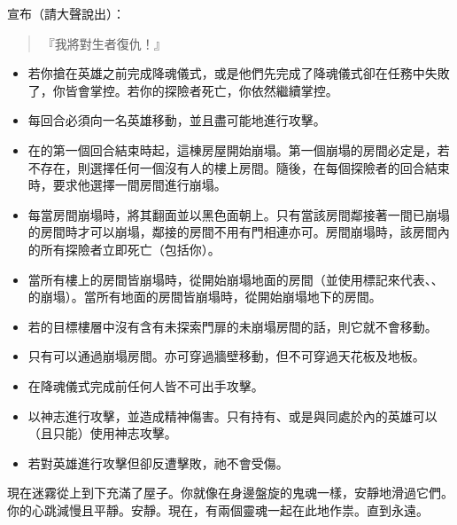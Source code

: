 宣布（請大聲說出）：
\begin{quote}
  『我將對生者復仇！』
\end{quote}

\vfill\null\pagebreak

\begin{itemize}
  \item 若你搶在英雄之前完成降魂儀式，或是他們先完成了降魂儀式卻在任務中失敗了，你皆會掌控。若你的探險者死亡，你依然繼續掌控。
  \item {}每回合必須向一名英雄移動，並且盡可能地進行攻擊。
  \item 在的第一個回合結束時起，這棟房屋開始崩塌。第一個崩塌的房間必定是，若不存在，則選擇任何一個沒有人的樓上房間。隨後，在每個探險者的回合結束時，要求他選擇一間房間進行崩塌。
  \item 每當房間崩塌時，將其翻面並以黑色面朝上。只有當該房間鄰接著一間已崩塌的房間時才可以崩塌，鄰接的房間不用有門相連亦可。房間崩塌時，該房間內的所有探險者立即死亡（包括你）。
  \item 當所有樓上的房間皆崩塌時，從開始崩塌地面的房間（並使用標記來代表、、的崩塌）。當所有地面的房間皆崩塌時，從開始崩塌地下的房間。
  \item 若的目標樓層中沒有含有未探索門扉的未崩塌房間的話，則它就不會移動。
  \item 只有可以通過崩塌房間。亦可穿過牆壁移動，但不可穿過天花板及地板。
\end{itemize}

\vspace*{-1em}
\begin{itemize}
  \item 在降魂儀式完成前任何人皆不可出手攻擊。\iffalse{如果英雄控制\Monster*{Ghost}，他們會告知你特殊攻擊規則。}\fi
  \item {}以神志進行攻擊，並造成精神傷害。只有持有、或是與同處於內的英雄可以（且只能）使用神志攻擊。
  \item 若對英雄進行攻擊但卻反遭擊敗，祂不會受傷。
\end{itemize}

\begin{HauntStory}
  現在迷霧從上到下充滿了屋子。你就像在身邊盤旋的鬼魂一樣，安靜地滑過它們。你的心跳減慢且平靜。安靜。現在，有兩個靈魂一起在此地作祟。直到永遠。
\end{HauntStory}

